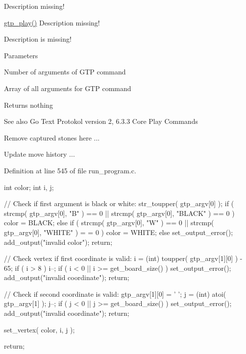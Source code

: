 Description missing! 

\hyperlink{group___g_t_p___core___play___commands_ga16a060c01868977200be0b381b03c6f9}{gtp\_\-play()} Description missing!

\begin{Desc}
\item[\hyperlink{todo__todo000004}{Todo}]Description is missing!\end{Desc}



\begin{DoxyParams}{Parameters}
\item[\mbox{\tt[in]} {\em gtp\_\-argc}]Number of arguments of GTP command \item[\mbox{\tt[in]} {\em gtp\_\-argv}]Array of all arguments for GTP command \end{DoxyParams}
\begin{DoxyReturn}{Returns}
nothing 
\end{DoxyReturn}
\begin{DoxySeeAlso}{See also}
Go Text Protokol version 2, 6.3.3 Core Play Commands 
\end{DoxySeeAlso}


\begin{Desc}
\item[\hyperlink{todo__todo000005}{Todo}]Remove captured stones here ... \end{Desc}
\begin{Desc}
\item[\hyperlink{todo__todo000006}{Todo}]Update move history ... \end{Desc}




Definition at line 545 of file run\_\-program.c.




\begin{DoxyCode}
{
    int color;
    int i, j;

    // Check if first argument is black or white:
    str_toupper( gtp_argv[0] );
    if ( strcmp( gtp_argv[0], "B" ) == 0 || strcmp( gtp_argv[0], "BLACK" ) == 0 )
       {
        color = BLACK;
    }
    else if ( strcmp( gtp_argv[0], "W" ) == 0 || strcmp( gtp_argv[0], "WHITE" ) =
      = 0 ) {
        color = WHITE;
    }
    else {
        set_output_error();
        add_output("invalid color");
        return;
    }

    // Check vertex if first coordinate is valid:
    i = (int) toupper( gtp_argv[1][0] ) - 65;
    if ( i > 8 ) {
        i--;
    }
    if ( i < 0 || i >= get_board_size() ) {
        set_output_error();
        add_output("invalid coordinate");
        return;
    }

    // Check if second coordinate is valid:
    gtp_argv[1][0] = ' ';
    j = (int) atoi( gtp_argv[1] );
    j--;
    if ( j < 0 || j >= get_board_size() ) {
        set_output_error();
        add_output("invalid coordinate");
        return;
    }

    set_vertex( color, i, j );


    return;
}
\end{DoxyCode}


